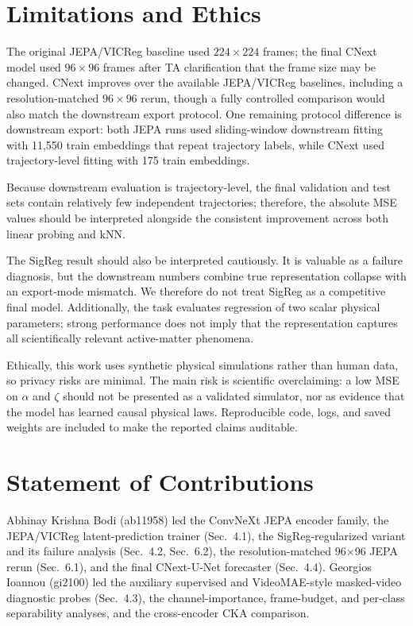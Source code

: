 \documentclass{article}
\begin{document}
\section{Limitations and Ethics}

The original JEPA/VICReg baseline used $224\times224$ frames; the final CNext model used $96\times96$ frames after TA clarification that the frame size may be changed. CNext improves over the available JEPA/VICReg baselines, including a resolution-matched $96\times96$ rerun, though a fully controlled comparison would also match the downstream export protocol. One remaining protocol difference is downstream export: both JEPA runs used sliding-window downstream fitting with 11,550 train embeddings that repeat trajectory labels, while CNext used trajectory-level fitting with 175 train embeddings.

Because downstream evaluation is trajectory-level, the final validation and test sets contain relatively few independent trajectories; therefore, the absolute MSE values should be interpreted alongside the consistent improvement across both linear probing and kNN.

The SigReg result should also be interpreted cautiously. It is valuable as a failure diagnosis, but the downstream numbers combine true representation collapse with an export-mode mismatch. We therefore do not treat SigReg as a competitive final model. Additionally, the task evaluates regression of two scalar physical parameters; strong performance does not imply that the representation captures all scientifically relevant active-matter phenomena.

Ethically, this work uses synthetic physical simulations rather than human data, so privacy risks are minimal. The main risk is scientific overclaiming: a low MSE on $\alpha$ and $\zeta$ should not be presented as a validated simulator, nor as evidence that the model has learned causal physical laws. Reproducible code, logs, and saved weights are included to make the reported claims auditable.

\section{Statement of Contributions}

Abhinay Krishna Bodi (ab11958) led the ConvNeXt JEPA encoder family, the JEPA/VICReg latent-prediction trainer (Sec.~4.1), the SigReg-regularized variant and its failure analysis (Sec.~4.2, Sec.~6.2), the resolution-matched 96$\times$96 JEPA rerun (Sec.~6.1), and the final CNext-U-Net forecaster (Sec.~4.4). Georgios Ioannou (gi2100) led the auxiliary supervised and VideoMAE-style masked-video diagnostic probes (Sec.~4.3), the channel-importance, frame-budget, and per-class separability analyses, and the cross-encoder CKA comparison.
\end{document}
